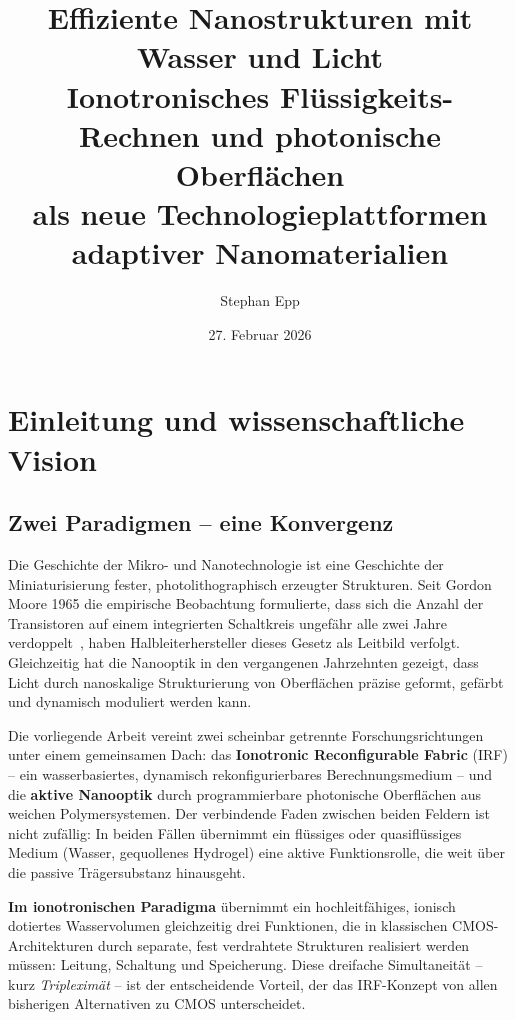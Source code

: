 ﻿\documentclass[a4paper,12pt]{scrreprt}
\title{\textbf{Effiziente Nanostrukturen mit\\ Wasser und Licht}\\[0.8ex]
  \large Ionotronisches Flüssigkeits-Rechnen und photonische Oberflächen\\
  als neue Technologieplattformen adaptiver Nanomaterialien}
\author{Stephan Epp}
\date{27. Februar 2026}
\theoremstyle{definition}
\begin{document}
\maketitle
\tableofcontents
\newpage

\section{Einleitung und wissenschaftliche Vision}

\subsection{Zwei Paradigmen -- eine Konvergenz}

Die Geschichte der Mikro- und Nanotechnologie ist eine Geschichte der
Miniaturisierung fester, photolithographisch erzeugter Strukturen. Seit
Gordon Moore 1965 die empirische Beobachtung formulierte, dass sich die
Anzahl der Transistoren auf einem integrierten Schaltkreis ungefähr alle
zwei Jahre verdoppelt~\cite{moore1965}, haben Halbleiterhersteller dieses
Gesetz als Leitbild verfolgt. Gleichzeitig hat die Nanooptik in den
vergangenen Jahrzehnten gezeigt, dass Licht durch nanoskalige Strukturierung
von Oberflächen präzise geformt, gefärbt und dynamisch moduliert werden kann.

Die vorliegende Arbeit vereint zwei scheinbar getrennte Forschungsrichtungen
unter einem gemeinsamen Dach: das \textbf{Ionotronic Reconfigurable Fabric}
(IRF) -- ein wasserbasiertes, dynamisch rekonfigurierbares Berechnungsmedium
-- und die \textbf{aktive Nanooptik} durch programmierbare photonische
Oberflächen aus weichen Polymersystemen. Der verbindende Faden zwischen
beiden Feldern ist nicht zufällig: In beiden Fällen übernimmt ein flüssiges
oder quasiflüssiges Medium (Wasser, gequollenes Hydrogel) eine aktive
Funktionsrolle, die weit über die passive Trägersubstanz hinausgeht.

\textbf{Im ionotronischen Paradigma} übernimmt ein hochleitfähiges, ionisch
dotiertes Wasservolumen gleichzeitig drei Funktionen, die in klassischen
CMOS-Architekturen durch separate, fest verdrahtete Strukturen realisiert
werden müssen: Leitung, Schaltung und Speicherung. Diese dreifache
Simultaneität -- kurz \emph{Tripleximät} -- ist der entscheidende Vorteil,
der das IRF-Konzept von allen bisherigen Alternativen zu CMOS unterscheidet.
\end{document}
